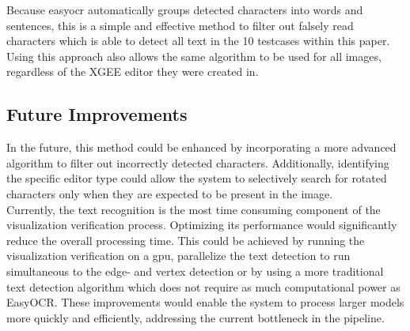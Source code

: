 Because easyocr automatically groups detected characters into words and sentences, this is a simple and effective method to filter out falsely read characters which is able to detect all text in the 10 testcases within this paper. Using this approach also allows the same algorithm to be used for all images, regardless of the XGEE editor they were created in.
\subsection{Future Improvements}
In the future, this method could be enhanced by incorporating a more advanced algorithm to filter out incorrectly detected characters. Additionally, identifying the specific editor type could allow the system to selectively search for rotated characters only when they are expected to be present in the image.\\
Currently, the text recognition is the most time consuming component of the visualization verification process. Optimizing its performance would significantly reduce the overall processing time. This could be achieved by running the visualization verification on a gpu, parallelize the text detection to run simultaneous to the edge- and vertex detection or by using a more traditional text detection algorithm which does not require as much computational power as EasyOCR. These improvements would enable the system to process larger models more quickly and efficiently, addressing the current bottleneck in the pipeline.\\
